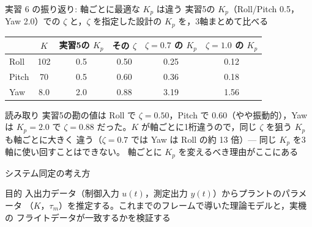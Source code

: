 \begin{frame}{実習 6 の振り返り: 軸ごとに最適な $K_p$ は違う\later}
  {\footnotesize 実習5の $K_p$（Roll/Pitch 0.5，Yaw 2.0）での $\zeta$ と，$\zeta$ を指定した設計の $K_p$ を，3軸まとめて比べる}

  \vspace{0.3em}

  \begin{table}
    \centering\footnotesize
    \begin{tabular}{lccccc}
      \hline
      & \textbf{$K$} & \textbf{実習5の $K_p$} & \textbf{その $\zeta$}
      & \textbf{$\zeta=0.7$ の $K_p$} & \textbf{$\zeta=1.0$ の $K_p$} \\
      \hline
      Roll  & 102 & 0.5 & 0.50 & 0.25 & 0.12 \\
      Pitch &  70 & 0.5 & 0.60 & 0.36 & 0.18 \\
      Yaw   & 8.0 & 2.0 & 0.88 & 3.19 & 1.56 \\
      \hline
    \end{tabular}
  \end{table}

  \vspace{0.5em}

  \begin{exampleblock}{読み取り}\footnotesize
    実習5の勘の値は Roll で $\zeta=0.50$，Pitch で $0.60$（やや振動的），Yaw は $K_p=2.0$ で
    $\zeta=0.88$ だった。$K$ が軸ごとに1桁違うので，同じ $\zeta$ を狙う $K_p$ も軸ごとに大きく
    違う（$\zeta=0.7$ では Yaw は Roll の約 13 倍）--- 同じ $K_p$ を3軸に使い回すことはできない。
    軸ごとに $K_p$ を変えるべき理由がここにある
  \end{exampleblock}
\end{frame}


\begin{frame}{システム同定の考え方}
  \begin{center}
  \end{center}

  \begin{block}{目的}\footnotesize
    入出力データ（制御入力 $u(t)$，測定出力 $y(t)$）からプラントのパラメータ
    （$K$，$\tau_m$）を推定する。これまでのフレームで導いた理論モデルと，実機の
    フライトデータが一致するかを検証する
  \end{block}
\end{frame}

